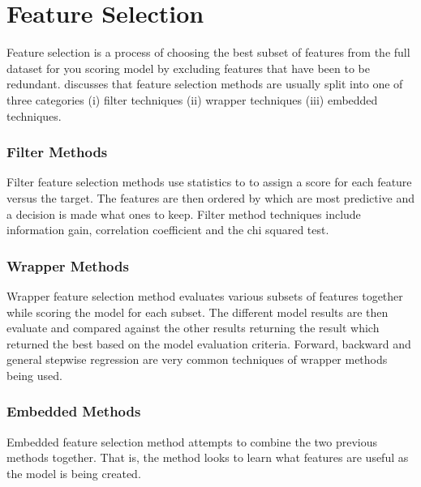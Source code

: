 \section{Feature Selection}\label{sec2:featureSection}
Feature selection is a process of choosing the best subset of features from the full dataset for you scoring model by excluding features that have been to be redundant. \cite{guyon_introduction_2003} discusses that feature selection methods are usually split into one of three categories (i) filter techniques (ii) wrapper techniques (iii) embedded techniques. 

\subsubsection{Filter Methods}
Filter feature selection methods use statistics to to assign a score for each feature versus the target. The features are then ordered by which are most predictive and a decision is made what ones to keep. Filter method techniques include information gain, correlation coefficient and the chi squared test.

\subsubsection{Wrapper Methods}
Wrapper feature selection method evaluates various subsets of features together while scoring the model for each subset. The different model results are then evaluate and compared against the other results returning the result which returned the best based on the model evaluation criteria. Forward, backward and general stepwise regression are very common techniques of wrapper methods being used.

\subsubsection{Embedded Methods}
Embedded feature selection method attempts to combine the two previous methods together. That is, the method looks to learn what features are useful as the model is being created. 

